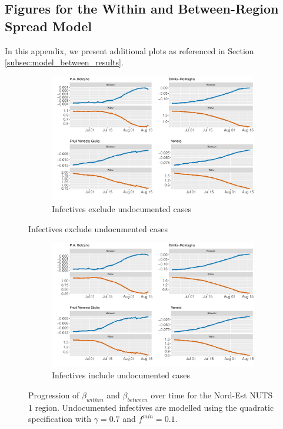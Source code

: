 \documentclass[12pt]{article}
\begin{document}
\begin{appendices}
		\subsection{Figures for the Within and Between-Region Spread Model} \label{sapp:model_between_figures}
		In this appendix, we present additional plots as referenced in Section \ref{subsec:model_between_results}.
		
		\begin{figure}[H]
    	    \centering
    	    \begin{subfigure}{\textwidth}
    	      \centering
    	      \includegraphics[width=0.85\linewidth]{output/model_between_lag14_betas_Nord-Est_rolling.pdf}
    	      \caption{Infectives exclude undocumented cases}
    	      \label{fig:beta_between_over_time_nordest_regular}
    	    \end{subfigure}
        \end{figure}
        \begin{figure}[H]\ContinuedFloat
    	    \begin{subfigure}{\textwidth}
    	      \centering
    	      \includegraphics[width=0.85\linewidth]{output/model_between_lag14_betas_Nord-Est_UndocQuadratic_rolling.pdf}
    	      \caption{Infectives include undocumented cases}
    	      \label{fig:beta_between_over_time_nordest_regular_undoc}
    	    \end{subfigure}
    	    \caption{Progression of $\beta_{within}$ and $\beta_{between}$ over time for the Nord-Est NUTS 1 region. Undocumented infectives are modelled using the quadratic specification with $\gamma = 0.7$ and $f^{min}=0.1$.}
    	    \label{fig:beta_between_over_time_nordest}
        \end{figure}
		

\end{appendices}
\end{document}
